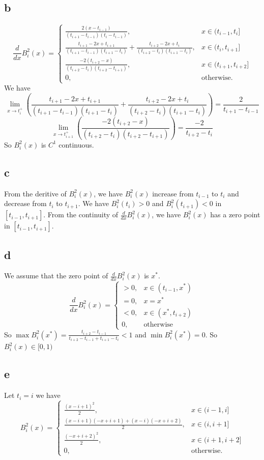 \documentclass[a4paper]{article}
\begin{document}
\subsection*{b}
\[
\frac{d}{dx}B^2_i(x) =
\begin{cases}
\frac{2(x - t_{i-1})}{(t_{i+1} - t_{i-1})(t_i - t_{i-1})}, & x \in (t_{i-1}, t_i] \\
\frac{t_{i+1} - 2x + t_{i+1}}{(t_{i+1} - t_{i-1})(t_{i+1} - t_i)} + \frac{t_{i+2} - 2x + t_i}{(t_{i+2} - t_i)(t_{i+1} - t_i)}, & x \in (t_i, t_{i+1}] \\
\frac{-2(t_{i+2} - x)}{(t_{i+2} - t_i)(t_{i+2} - t_{i+1})}, & x \in (t_{i+1}, t_{i+2}] \\
0, & \text{otherwise}.
\end{cases}
\]
We have $$\lim_{x \to t_i^+}(\frac{t_{i+1} - 2x + t_{i+1}}{(t_{i+1} - t_{i-1})(t_{i+1} - t_i)} + \frac{t_{i+2} - 2x + t_i}{(t_{i+2} - t_i)(t_{i+1} - t_i)})=\frac{2}{t_{i+1}-t_{i-1}} $$
$$\lim_{x \to t_{i+1}^+}(\frac{-2(t_{i+2} - x)}{(t_{i+2} - t_i)(t_{i+2} - t_{i+1})}) = \frac{-2}{t_{i+2}-t_i}$$
So $B^2_i(x)$ is $C^1$ continuous.

\subsection*{c}
From the deritive of $B^2_i(x)$, we have $B^2_i(x)$ increase from $t_{i-1}$ to $t_i$ and decrease from $t_i$ to $t_{i+1}$.
We have $B^2_i(t_i)> 0$ and $B^2_i(t_{i+1}) < 0$ in $[t_{i-1},t_{i+1}]$.
From the continuity of $\frac{d}{dx}B^2_i(x)$, we have $B^2_i(x)$ has a zero point in $[t_{i-1},t_{i+1}]$.

\subsection*{d}
We assume that the zero point of $\frac{d}{dx}B^2_i(x)$ is $x^*$.
\[
\frac{d}{dx}B^2_i(x) =
\begin{cases}
  >0, & x \in (t_{i-1}, x^*) \\
  =0, & x = x^* \\
  <0, & x \in (x^*, t_{i+2})\\
  0, & \text{otherwise}
\end{cases}
\]
So $\max B^2_i(x^*)= \frac{t_{i+2}-t_{i-1}}{t_{i+2}-t_{i-1}+t_{i+1}-t_i}<1$ and $\min B^2_i(x^*)=0$.
So $B^2_i(x) \in [0,1)$

\subsection*{e}
Let $t_i = i$ we have
\[
B^2_i(x) =
\begin{cases}
\frac{(x - i + 1)^2}{2}, & x \in (i-1, i] \\
\frac{(x - i + 1)(- x + i + 1) + (x - i)(-x + i + 2)}{2}, & x \in (i, i+1] \\
\frac{(-x + i + 2)^2}{2}, & x \in (i+1, i+2] \\
0, & \text{otherwise}.
\end{cases}
\]
\end{document}
